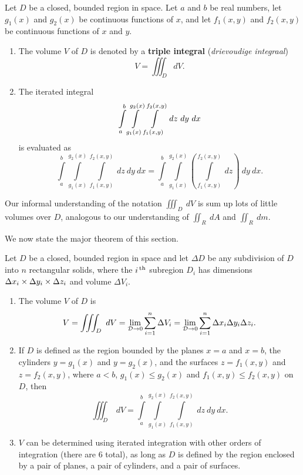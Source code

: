 \begin{definition}
\label{def:triple_integral}
Let $D$ be a closed, bounded region in space. Let $a$ and $b$ be real numbers, let $g_1(x)$ and $g_2(x)$ be continuous functions of $x$, and let $f_1(x,y)$ and $f_2(x,y)$ be continuous functions of $x$ and $y$.
\begin{enumerate}
	\item	The volume $V$ of $D$ is denoted by a \textbf{triple integral} (\textit{drievoudige integraal})
	$$V = \iiint_D dV.$$
	
	\item The iterated integral 
	$$\displaystyle \int\limits_a^b\int\limits_{g_1(x)}^{g_2(x)}\int\limits_{f_1(x,y)}^{f_2(x,y)} \ dz\ dy\ dx$$
	is evaluated as 
	$$\int\limits_a^b\int\limits_{g_1(x)}^{g_2(x)}\int\limits_{f_1(x,y)}^{f_2(x,y)} \ dz\ dy\ dx=\int\limits_a^b\int\limits_{g_1(x)}^{g_2(x)}\left(\int\limits_{f_1(x,y)}^{f_2(x,y)} \ dz\right)\ dy\ dx.$$

	
	
\end{enumerate}

\end{definition}

Our informal understanding of the notation $\iiint_D\ dV$ is sum up lots of little volumes over $D$, analogous to our understanding of $\iint_R\ dA$ and $\iint_R\ dm$.

We now state the major theorem of this section.

\begin{theorem}
\label{thm:triple_integration}
Let $D$ be a closed, bounded region in space and let $\Delta D$ be any subdivision of $D$ into $n$ rectangular solids, where the  $i^\text{\,th}$ subregion $D_i$ has dimensions $\Delta x_i\times\Delta y_i\times\Delta z_i$ and volume $\Delta V_i$.
\begin{enumerate}
	\item The volume $V$ of $D$ is
	$$V = \iiint_D\ dV = \lim_{\mathcal{D}\to0} \sum_{i=1}^n \Delta V_i = \lim_{\mathcal{D}\to0} \sum_{i=1}^n \Delta x_i\Delta y_i\Delta z_i.$$
	
	\item		If $D$ is defined as the region bounded by the planes $x=a$ and $x=b$, the cylinders $y=g_1(x)$ and $y=g_2(x)$, and the surfaces $z=f_1(x,y)$ and $z=f_2(x,y)$, where $a<b$, $g_1(x)\leq g_2(x)$ and $f_1(x,y)\leq f_2(x,y)$ on $D$, then
	$$\iiint_D \ dV = \int\limits_a^b\int\limits_{g_1(x)}^{g_2(x)}\int\limits_{f_1(x,y)}^{f_2(x,y)} \ dz\ dy\ dx.$$
	
	\item		$V$ can be determined using iterated integration with other orders of integration (there are 6 total), as long as $D$ is defined by the region enclosed by a pair of planes, a pair of cylinders, and a pair of surfaces.
\end{enumerate}

\end{theorem}


